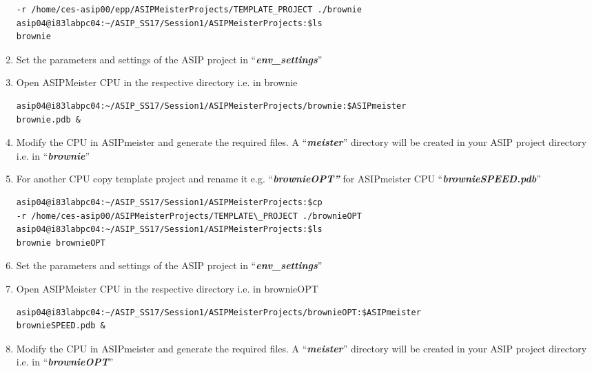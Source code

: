 \begin{enumerate}
\begin{lstlisting}
-r /home/ces-asip00/epp/ASIPMeisterProjects/TEMPLATE_PROJECT ./brownie
asip04@i83labpc04:~/ASIP_SS17/Session1/ASIPMeisterProjects:$ls
brownie
\end{lstlisting}
\item Set the parameters and settings of the ASIP project in
	``\emph{\textbf{env\_settings}}''
\item Open ASIPMeister CPU in the respective directory i.e. in brownie
\begin{lstlisting}
asip04@i83labpc04:~/ASIP_SS17/Session1/ASIPMeisterProjects/brownie:$ASIPmeister
brownie.pdb &
\end{lstlisting}
\item Modify the CPU in ASIPmeister and generate the required files. A
	``\emph{\textbf{meister}}'' directory will be created in your ASIP
	project directory i.e. in ``\emph{\textbf{brownie}}''
\item For another CPU copy template project and rename it e.g.
	``\emph{\textbf{brownieOPT''}} for ASIPmeister CPU
	``\emph{\textbf{brownieSPEED.pdb}}''
\begin{lstlisting}
asip04@i83labpc04:~/ASIP_SS17/Session1/ASIPMeisterProjects:$cp
-r /home/ces-asip00/ASIPMeisterProjects/TEMPLATE\_PROJECT ./brownieOPT
asip04@i83labpc04:~/ASIP_SS17/Session1/ASIPMeisterProjects:$ls
brownie brownieOPT
\end{lstlisting}
\item Set the parameters and settings of the ASIP project in
	``\emph{\textbf{env\_settings}}''
\item Open ASIPMeister CPU in the respective directory i.e. in brownieOPT
\begin{lstlisting}
asip04@i83labpc04:~/ASIP_SS17/Session1/ASIPMeisterProjects/brownieOPT:$ASIPmeister
brownieSPEED.pdb &
\end{lstlisting}
\item Modify the CPU in ASIPmeister and generate the required files. A
	``\emph{\textbf{meister}}'' directory will be created in your ASIP
	project directory i.e. in ``\emph{\textbf{brownieOPT}}''
\end{enumerate}